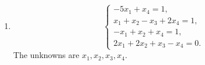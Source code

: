 \begin{enumerate}[label=\alph*)]
\begin{answer}
Here
\[
 A=\begin{bmatrix}1&1&2\\-1&0&1\\2&1&-1\end{bmatrix},\quad
 B=\begin{bmatrix}2\\-1\\1\end{bmatrix},\quad \det A=-2.
\]
The replacement determinants are
\[
\begin{aligned}
 \det A_1&=\det\begin{bmatrix}2&1&2\\-1&0&1\\1&1&-1\end{bmatrix}=-4,\\
 \det A_2&=\det\begin{bmatrix}1&2&2\\-1&-1&1\\2&1&-1\end{bmatrix}=4,\\
 \det A_3&=\det\begin{bmatrix}1&1&2\\-1&0&-1\\2&1&1\end{bmatrix}=-2.
\end{aligned}
\]
Cramer's rule gives $(x,y,z)=(2,-2,1)$.
\end{answer}

\item
\[
\begin{cases}-5x_1+x_4=1,\\x_1+x_2-x_3+2x_4=1,\\-x_1+x_2+x_4=1,\\2x_1+2x_2+x_3-x_4=0.\end{cases}
\]
The unknowns are $x_1,x_2,x_3,x_4$.


\end{enumerate}

